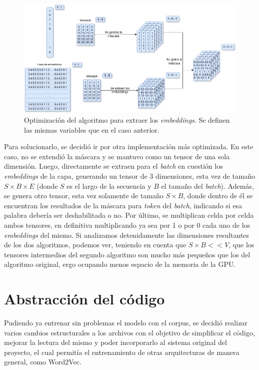 \begin{figure}[H]
    \centering
    \includegraphics[width=1\textwidth]{imagenes/algoritmo_nuevo.png}
    \caption{Optimización del algoritmo para extraer los \textit{embeddings}. Se definen las mismas variables que en el caso anterior.}
    \label{fig:algoritmo_nuevo}
\end{figure}

Para solucionarlo, se decidió ir por otra implementación más optimizada. En este caso, no se extendió la máscara y se mantuvo como un tensor de una sola dimensión. Luego, directamente se extraen para el \textit{batch} en cuestión los \textit{embeddings} de la capa, generando un tensor de 3 dimensiones, esta vez de tamaño $S \times B \times E$ (donde $S$ es el largo de la secuencia y $B$ el tamaño del \textit{batch}). Además, se genera otro tensor, esta vez solamente de tamaño $S \times B$, donde dentro de él se encuentran los resultados de la máscara para \textit{token} del \textit{batch}, indicando si esa palabra debería ser deshabilitada o no. Por último, se multiplican celda por celda ambos tensores, en definitiva multiplicando ya sea por 1 o por 0 cada uno de los \textit{embeddings} del mismo. Si analizamos detenidamente las dimensiones resultantes de los dos algoritmos, podemos ver, teniendo en cuenta que $S \times B << V$, que los tensores intermedios del segundo algoritmo son mucho más pequeños que los del algoritmo original, ergo ocupando menos espacio de la memoria de la GPU.

\section{Abstracción del código}

Pudiendo ya entrenar sin problemas el modelo con el corpus, se decidió realizar varios cambios estructurales a los archivos con el objetivo de simplificar el código, mejorar la lectura del mismo y poder incorporarlo al sistema original del proyecto, el cual permitía el entrenamiento de otras arquitecturas de manera general, como Word2Vec.

